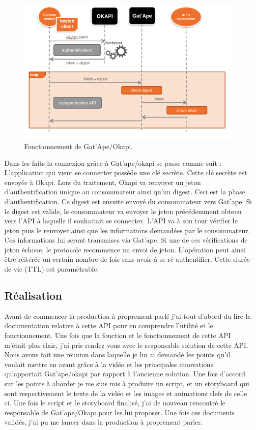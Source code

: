 \begin{figure}[htp]
  \centering
  \includegraphics[width=15cm]{images/gao/gao1}
  \caption{Fonctionnement de Gat'Ape/Okapi.}
  \label{gatape}
\end{figure}


Dans les faits la connexion grâce à Gat'ape/okapi se passe comme suit : 
L'application qui vient se connecter possède une clé secrète. Cette clé secrète est envoyée à Okapi. Lors du traitement, Okapi va renvoyer un jeton d'authentification unique au consommateur ainsi qu'un digest. Ceci est la phase d'authentification.  Ce digest est ensuite envoyé du consommateur vers Gat'ape. Si le digest est valide, le consommateur va envoyer le jeton précédemment obtenu vers l'API à laquelle il souhaitait se connecter. L'API va à son tour vérifier le jeton puis le renvoyer ainsi que les informations demandées par le consommateur. Ces informations lui seront transmises via Gat'ape. Si une de ces vérifications de jeton échoue, le protocole recommence un envoi de jeton. L'opération peut ainsi être réitérée un certain nombre de fois sans avoir à se ré authentifier. Cette durée de vie (TTL) est paramétrable.




\subsection{Réalisation}
Avant de commencer la production à proprement parlé j'ai tout d'abord du lire la documentation relative à cette API pour en comprendre l'utilité et le fonctionnement. Une fois que la fonction et le fonctionnement de cette API m'était plus clair, j'ai pris rendez vous avec le responsable solution de cette API. Nous avons fait une réunion dans laquelle je lui ai demandé les points qu'il voulait mettre en avant grâce à la vidéo et les principales innovations qu'apportait Gat'ape/okapi par rapport à l'ancienne solution. Une fois d'accord sur les points à aborder je me suis mis à produire un script, et un storyboard qui sont respectivement le texte de la vidéo et les images et animations clefs de celle ci. Une fois le script et le storyboard finalisé, j'ai de nouveau rencontré le responsable de Gat'ape/Okapi pour les lui proposer. Une fois ces documents validés, j'ai pu me lancer dans la production à proprement parler. \\

